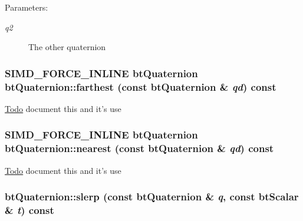 \begin{Desc}
\item[Parameters:]
\begin{description}
\item[{\em q2}]The other quaternion \end{description}
\end{Desc}
\hypertarget{classbt_quaternion_deda27273475435a9e3223abeea73992}{
\subsubsection[farthest]{\setlength{\rightskip}{0pt plus 5cm}SIMD\_\-FORCE\_\-INLINE {\bf btQuaternion} btQuaternion::farthest (const {\bf btQuaternion} \& {\em qd}) const}}
\label{classbt_quaternion_deda27273475435a9e3223abeea73992}


\begin{Desc}
\item[\hyperlink{todo__todo000042}{Todo}]document this and it's use \end{Desc}
\hypertarget{classbt_quaternion_821a38604c6333b95d954867315d8716}{
\subsubsection[nearest]{\setlength{\rightskip}{0pt plus 5cm}SIMD\_\-FORCE\_\-INLINE {\bf btQuaternion} btQuaternion::nearest (const {\bf btQuaternion} \& {\em qd}) const}}
\label{classbt_quaternion_821a38604c6333b95d954867315d8716}


\begin{Desc}
\item[\hyperlink{todo__todo000043}{Todo}]document this and it's use \end{Desc}
\hypertarget{classbt_quaternion_c95a27feda1c165b2ce359e7415fec6f}{
\subsubsection[slerp]{ btQuaternion::slerp (const {\bf btQuaternion} \& {\em q}, \/  const btScalar \& {\em t}) const}}
\label{classbt_quaternion_c95a27feda1c165b2ce359e7415fec6f}


